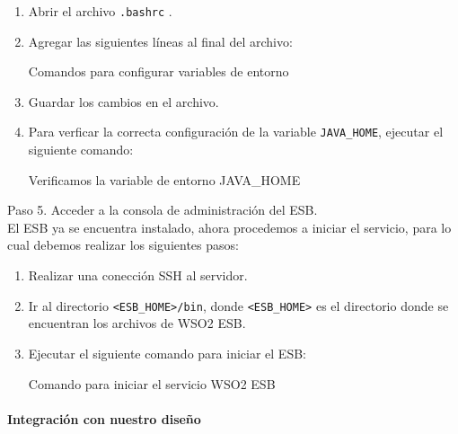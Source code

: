 \begin{enumerate}
  \item Abrir el archivo \texttt{.bashrc} .
  \item Agregar las siguientes líneas al final del archivo: \\
        \begin{listing}[H]
          \caption{Comandos para configurar variables de entorno}
          \label{soa:tecnologias:wso2:bash-configurar-variables-de-entorno}
        \end{listing}
  \item Guardar los cambios en el archivo. \\
  \item Para verficar la correcta configuración de la variable \verb|JAVA_HOME|, ejecutar el siguiente comando: \\
        \begin{listing}[H]
          \caption{Verificamos la variable de entorno JAVA\_HOME}
          \label{soa:tecnologias:wso2:bash-verificar-variable-de-entorno}
        \end{listing}
\end{enumerate}

Paso 5. Acceder a la consola de administración del ESB.\\
El ESB ya se encuentra instalado, ahora procedemos a iniciar el servicio, para lo cual debemos realizar los siguientes pasos:

\begin{enumerate}
  \item Realizar una conección SSH al servidor.
  \item Ir al directorio \verb|<ESB_HOME>/bin|, donde \verb|<ESB_HOME>| es el directorio donde se encuentran los archivos de WSO2 ESB.
  \item Ejecutar el siguiente comando para iniciar el ESB:\\
        \begin{listing}[H]
          \caption{Comando para iniciar el servicio WSO2 ESB}
          \label{soa:tecnologias:wso2:bash-inicio-de-servicio}
        \end{listing}
\end{enumerate}


\paragraph{Integración con nuestro diseño}

